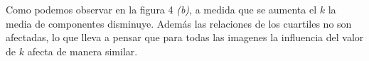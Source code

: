 \begin{figure}[H]
	\begin{center}
	\hspace{5mm}
	\caption{}
	\end{center}
	\label{comp_k}
\end{figure}
\vspace{-7mm} 

\indent Como podemos observar en la figura 4 \textit{(b)}, a medida que se aumenta el $k$ la media de componentes disminuye. Además las relaciones de los cuartiles no son afectadas, lo que lleva a pensar que para todas las imagenes la influencia del valor de $k$ afecta de manera similar.

